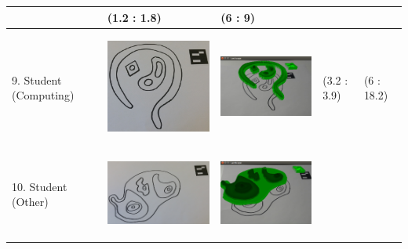 \documentclass[11pt]{article}
\begin{document}
\begin{landscape}
\begin{longtable}{p{}| p{}| p{} | p{} |p{}}
							& (1.2 : 1.8)
							& (6 : 9)\\
\hline
9. Student (Computing) & \begin{center}\includegraphics[scale=0.5]{pics/usertesting/9.png}\end{center} 
							& \begin{center}\includegraphics[scale=0.5]{pics/usertesting/9render.png}\end{center} 
							& (3.2 : 3.9)
							& (6 : 18.2)\\
\hline
10. Student (Other) & \begin{center}\includegraphics[scale=0.5]{pics/usertesting/10.png}\end{center} 
							& \begin{center}\includegraphics[scale=0.5]{pics/usertesting/10render.png}\end{center} 

\end{longtable}
\end{landscape}
\end{document}
